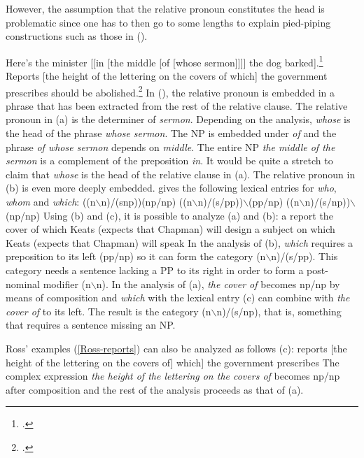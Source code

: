 However, the assumption that the relative pronoun constitutes the head is problematic since one has to then go to some lengths to explain pied-piping
constructions such as those in ().

\eal
\ex\label{Beispiel-Minister}
Here's the minister [[in [the middle [of [whose sermon]]]] the dog barked].\footnote{
.
}
\ex Reports [the height of the lettering on the covers of which] the government prescribes should be
abolished.\label{Ross-reports}\footnote{
.\nocite{Ross86a-u}
}
\zl
In (), the relative pronoun is embedded in a phrase that has been extracted from the rest of the relative clause. The relative pronoun
in (a) is the determiner of \emph{sermon}. Depending on the analysis, \emph{whose} is the head of the phrase \emph{whose sermon}.
The NP is embedded under \emph{of} and the phrase \emph{of whose sermon} depends on \emph{middle}. The entire NP \emph{the middle of the sermon}
is a complement of the preposition \emph{in}. It would be quite a stretch to claim that \emph{whose} is the head of the relative clause in (a).
The relative pronoun in (b) is even more deeply embedded.
\citet[]{Steedman97a} gives the following lexical entries for \emph{who},
\emph{whom} and \emph{which}:
\eal
\label{le-relpron-Steedman}
\settowidth{}
\ex ((n$\backslash$n)/(s\bs np))\bs (np/np)       
\ex ((n$\backslash$n)/(s/pp))$\backslash$(pp/np)  
\ex ((n$\backslash$n)/(s/np))$\backslash$(np/np)  
\zl
Using (b) and (c), it is possible to analyze (a) and (b):
\eal
\ex a report the cover of which Keats (expects that Chapman) will design
\ex a subject on which Keats (expects that Chapman) will speak
\zl
In the analysis of (b), \emph{which} requires a preposition to its left (pp/np) so it can form the category
(n$\backslash$n)/(s/pp). This category needs a sentence lacking a PP to its right in order to form a post-nominal
modifier (n$\backslash$n). In the analysis of (a), \emph{the cover of} becomes np/np by means
of composition and \emph{which} with the lexical entry (c) can combine with \emph{the cover of} to its left. The result is
the category (n$\backslash$n)/(s/np), that is, something that requires a sentence missing an NP.

Ross' examples (\ref{Ross-reports}) can also be analyzed as follows (c):
\ea
reports [the height of the lettering on the covers of]
which] the government prescribes
\z
The complex expression \emph{the height of the lettering on the covers of} becomes np/np after composition and the rest of the analysis
proceeds as that of (a).

